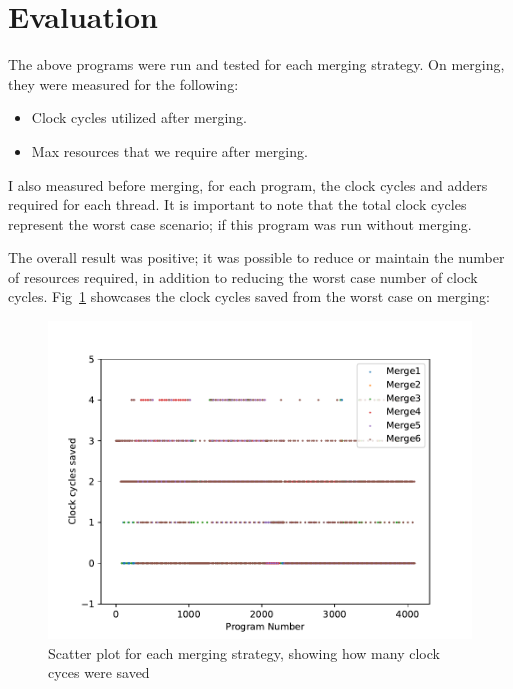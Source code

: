 \section{Evaluation}

    The above programs were run and tested for each merging strategy. 
    On merging, they were measured for the following: 
    \begin{itemize}
        \item Clock cycles utilized after merging. 
        \item Max resources that we require after merging. 
    \end{itemize}

    I also measured before merging, for each program, the clock cycles and adders required for each thread. 
    It is important to note that the total clock cycles represent the worst case scenario; if this program was run without merging. 

    The overall result was positive; it was possible to reduce or maintain the number of resources required, in addition to reducing the worst case number of clock cycles.
    Fig~\ref{Fig1} showcases the clock cycles saved from the worst case on merging: 
    \begin{figure}
        \centering
        \includegraphics[scale=0.5]{m01.pdf}
        \caption{Scatter plot for each merging strategy, showing how many clock cyces were saved}
        \label{Fig1}
    \end{figure}

